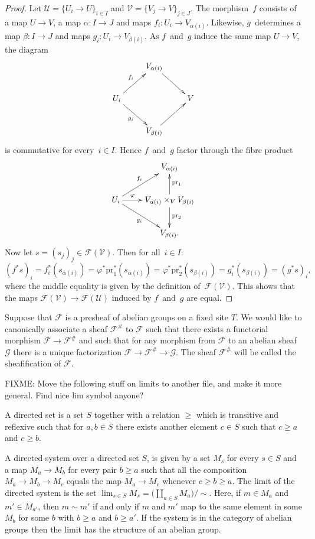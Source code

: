 \begin{proof}
Let $\mathcal{U}=\{U_i \to U\}_{i\in I}$ and 
$\mathcal{V}=\{V_j \to V\}_{j\in J}$.
The morphism~$f$ consists of a map $U\to V$, a map $\alpha\colon I\to J$ and
maps $f_i\colon U_i\to V_{\alpha(i)}$.
Likewise, $g$~determines a map $\beta\colon I\to J$ and maps
$g_i\colon U_i\to V_{\beta(i)}$.
As $f$~and~$g$ induce the same map $U\to V$, the diagram
$$\xymatrix{&V_{\alpha(i)}\ar[dr]\\
  U_i\ar[ur]^{f_i}\ar[dr]_{g_i}&&V\\
  &V_{\beta(i)}\ar[ur]}$$
is commutative for every~$i\in I$. Hence $f$~and~$g$ factor through 
the fibre product
$$\xymatrix{&V_{\alpha(i)}\\
  U_i\ar[r]^-\varphi\ar[ur]^{f_i}\ar[dr]_{g_i}&
  V_{\alpha(i)}\times_VV_{\beta(i)}\ar[u]_{\text{pr}_1}\ar[d]^{\text{pr}_2}\\
  &V_{\beta(i)}.}$$
Now let $s=(s_j)_j\in\mathcal{F}(\mathcal{V})$.
Then for all~$i\in I$:
 $$(f^*s)_i=f_i^*(s_{\alpha(i)})=\varphi^*\text{pr}_1^*(s_{\alpha(i)})
   =\varphi^*\text{pr}_2^*(s_{\beta(i)})=g_i^*(s_{\beta(i)})=(g^*s)_i,$$
where the middle equality is given by the definition 
of~$\mathcal{F}(\mathcal{V})$.
This shows that the maps $\mathcal{F}(\mathcal{V})\to\mathcal{F}(\mathcal{U})$
induced by $f$~and~$g$ are equal.
\end{proof}

\smallskip\noindent
Suppose that $\mathcal{F}$ is a presheaf of abelian groups on a
fixed site $T$.  We would like to canonically associate a sheaf
$\mathcal{F}^\#$ to $\mathcal{F}$ such that there exists a
functorial morphism $\mathcal{F} \rightarrow \mathcal{F}^\#$ and such that for
any morphism from $\mathcal{F}$ to an abelian sheaf $\mathcal{G}$
there is a unique factorization $\mathcal{F} \rightarrow
\mathcal{F}^\# \rightarrow \mathcal{G}$. The sheaf $\mathcal{F}^\#$ will be
called the sheafification of $\mathcal{F}$.

\smallskip\noindent
FIXME: Move the following stuff on limits to another file, and make it
more general. Find nice lim symbol anyone?

\begin{definition}
A directed set is a set $S$ together with a relation $\geq$ which is
transitive and reflexive such that for $a, b \in S$ there exists another
element $c \in S$ such that $c \geq a$ and $c \geq b$.
\end{definition}

\noindent
A directed system over a directed set $S$, is given by a set $M_s$ for
every $s\in S$ and a map $M_a \to M_b$ for every pair $b\geq a$ such
that all the composition $M_a \to M_b \to M_c$ equals the map
$M_a \to M_c$ whenever $c \geq b \geq a$. The limit of the directed system
is the set $\lim_{s\in S} M_s = \big(\coprod_{a\in S} M_a\big)/\sim$. Here,
if $m\in M_a$ and $m'\in M_{a'}$, then $m \sim m'$ if and only if $m$ and $m'$
map to the same element in some $M_b$ for some $b$ with $b\geq a$ and
$b \geq a'$. If the system is in the category of abelian groups then the
limit has the structure of an abelian group.

